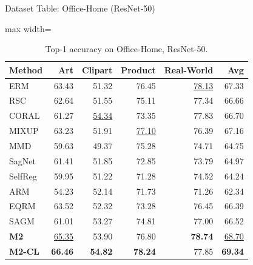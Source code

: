 \documentclass[t, aspectratio=169]{beamer} %
\begin{document}
	\begin{frame}{Dataset Table: Office-Home (ResNet-50)}
\begin{table}[htbp]
\centering
\caption{Top-1 accuracy on Office-Home, ResNet-50.}
\scriptsize
\begin{adjustbox}{max width=\textwidth}
\begin{tabular}{lrrrrr}
\toprule
Method & Art & Clipart & Product & Real-World & Avg \\
\midrule
ERM & 63.43 & 51.32 & 76.45 & \underline{78.13} & 67.33 \\
RSC & 62.64 & 51.55 & 75.11 & 77.34 & 66.66 \\
CORAL & 61.27 & \underline{54.34} & 73.35 & 77.83 & 66.70 \\
MIXUP & 63.23 & 51.91 & \underline{77.10} & 76.39 & 67.16 \\
MMD & 59.63 & 49.37 & 75.28 & 74.71 & 64.75 \\
SagNet & 61.41 & 51.85 & 72.85 & 73.79 & 64.97 \\
SelfReg & 59.95 & 51.22 & 71.28 & 74.52 & 64.24 \\
ARM & 54.23 & 52.14 & 71.73 & 71.26 & 62.34 \\
EQRM & 63.52 & 52.32 & 73.28 & 76.45 & 66.39 \\
SAGM & 61.01 & 53.27 & 74.81 & 77.00 & 66.52 \\
\midrule
\textbf{M2} & \underline{65.35} & 53.90 & 76.80 & \textbf{78.74} & \underline{68.70} \\
\textbf{M2-CL} & \textbf{66.46} & \textbf{54.82} & \textbf{78.24} & 77.85 & \textbf{69.34} \\
\bottomrule
\end{tabular}
\end{adjustbox}
\end{table}
	\end{frame}
\end{document}
